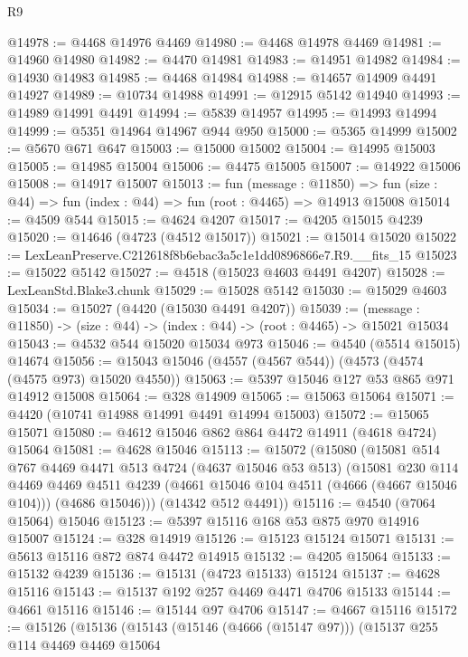 \begin{lexlean}{R9}
\begin{coremodule}
@14978 := @4468 @14976 @4469
@14980 := @4468 @14978 @4469
@14981 := @14960 @14980
@14982 := @4470 @14981
@14983 := @14951 @14982
@14984 := @14930 @14983
@14985 := @4468 @14984
@14988 := @14657 @14909 @4491 @14927
@14989 := @10734 @14988
@14991 := @12915 @5142 @14940
@14993 := @14989 @14991 @4491
@14994 := @5839 @14957
@14995 := @14993 @14994
@14999 := @5351 @14964 @14967 @944 @950
@15000 := @5365 @14999
@15002 := @5670 @671 @647
@15003 := @15000 @15002
@15004 := @14995 @15003
@15005 := @14985 @15004
@15006 := @4475 @15005
@15007 := @14922 @15006
@15008 := @14917 @15007
@15013 := fun (message : @11850) =>
  fun (size : @44) => fun (index : @44) => fun (root : @4465) => @14913 @15008
@15014 := @4509 @544
@15015 := @4624 @4207
@15017 := @4205 @15015 @4239
@15020 := @14646 (@4723 (@4512 @15017))
@15021 := @15014 @15020
@15022 := LexLeanPreserve.C212618f8b6ebac3a5c1e1dd0896866e7.R9.__fits_15
@15023 := @15022 @5142
@15027 := @4518 (@15023 @4603 @4491 @4207)
@15028 := LexLeanStd.Blake3.chunk
@15029 := @15028 @5142
@15030 := @15029 @4603
@15034 := @15027 (@4420 (@15030 @4491 @4207))
@15039 := (message : @11850) -> (size : @44) -> (index : @44) -> (root : @4465) -> @15021 @15034
@15043 := @4532 @544 @15020 @15034 @973
@15046 := @4540 (@5514 @15015) @14674
@15056 := @15043 @15046 (@4557 (@4567 @544)) (@4573 (@4574 (@4575 @973) @15020 @4550))
@15063 := @5397 @15046 @127 @53 @865 @971 @14912 @15008
@15064 := @328 @14909
@15065 := @15063 @15064
@15071 := @4420 (@10741 @14988 @14991 @4491 @14994 @15003)
@15072 := @15065 @15071
@15080 := @4612 @15046 @862 @864 @4472 @14911 (@4618 @4724) @15064
@15081 := @4628 @15046
@15113 := @15072
    (@15080
      (@15081
        @514
        @767
        @4469
        @4471
        @513
        @4724
        (@4637 @15046 @53 @513)
        (@15081
          @230
          @114
          @4469
          @4469
          @4511
          @4239
          (@4661 @15046 @104 @4511 (@4666 (@4667 @15046 @104)))
          (@4686 @15046)))
      (@14342 @512 @4491))
@15116 := @4540 (@7064 @15064) @15046
@15123 := @5397 @15116 @168 @53 @875 @970 @14916 @15007
@15124 := @328 @14919
@15126 := @15123 @15124 @15071
@15131 := @5613 @15116 @872 @874 @4472 @14915
@15132 := @4205 @15064
@15133 := @15132 @4239
@15136 := @15131 (@4723 @15133) @15124
@15137 := @4628 @15116
@15143 := @15137 @192 @257 @4469 @4471 @4706 @15133
@15144 := @4661 @15116
@15146 := @15144 @97 @4706
@15147 := @4667 @15116
@15172 := @15126
    (@15136
      (@15143
        (@15146 (@4666 (@15147 @97)))
        (@15137
          @255
          @114
          @4469
          @4469
          @15064

\end{coremodule}
\end{lexlean}
